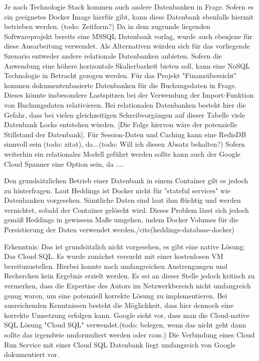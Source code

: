 \documentclass[pdftex,a4paper,abstracton,11pt,parskip=half,bibtotocnumbered]{scrartcl}
\begin{document}
		
		Je nach Technologie Stack kommen auch andere Datenbanken in Frage. Sofern es ein geeignetes Docker Image hierfür gibt, kann diese Datenbank ebenfalls hiermit betrieben werden. (todo: Zeitform?) Da in dem zugrunde liegenden Softwareprojekt bereits eine MSSQL Datenbank vorlag, wurde auch ebenjene für diese Ausarbeitung verwendet. Als Alternativen würden sich für das vorliegende Szenario entweder andere relationale Datenbanken anbieten. Sofern die Anwendung eine höhere horizontale Skalierbarkeit bieten soll, kann eine NoSQL Technologie in Betracht gezogen werden. Für das Projekt "Finanzübersicht" kommen dokumentenbasierte Datenbanken für die Buchungsdaten in Frage. Dieses könnte insbesondere Lastspitzen bei der Verwendung der Import-Funktion von Buchungsdaten relativieren. Bei relationalen Datenbanken besteht hier die Gefahr, dass bei vielen gleichzeitigen Schreibvorgängen auf dieser Tabelle viele Datenbank Locks entstehen würden. [Die Folge hiervon wäre der potenzielle Stillstand der Datenbank]. Für Session-Daten und Caching kann eine RedisDB sinnvoll sein (todo: zitat), da...(todo: Will ich diesen Absatz behalten?) Sofern weiterhin ein relationales Modell geführt werden sollte kann auch der Google Cloud Spanner eine Option sein, da .... 
		
		Den grundsätzlichen Betrieb einer Datenbank in einem Container gilt es jedoch zu hinterfragen. Laut Heddings ist Docker nicht für "stateful services" wie Datenbanken vorgesehen. Sämtliche Daten sind laut ihm flüchtig und werden vernichtet, sobald der Container gelöscht wird. Dieses Problem lässt sich jedoch gemäß Heddings in gewissem Maße umgehen, indem Docker Volumes für die Persistierung der Daten verwendet werden./cite(heddings-database-docker) 
		
		
	
		Erkenntnis: Das ist grundsätzlich nicht vorgesehen, es gibt eine native Lösung: Das Cloud SQL. Es wurde zunächst versucht mit einer kostenlosen
		VM bereituzustellen. Hierbei konnte nach umfangreichen Anstrengungen und Recherchen kein Ergebnis erzielt werden. Es sei an dieser Stelle jedoch
		kritisch zu vermerken, dass die Expertise des Autors im Netzwerkbereich nicht umfangreich genug waren, um eine potenziell korrekte Lösung zu implementieren.
		Bei ausreichenden Kenntnissen besteht die Möglichkeit, dass hier dennoch eine korrekte Umsetzung erfolgen kann. Google sieht vor, dass man die
		Cloud-native SQL Lösung "Cloud SQL" verwendet.(todo: belegen, wenn das nicht geht dann sollte das irgendwie umformuliert werden oder raus.)
		Die Verbindung eines Cloud Run Service mit einer Cloud SQL Datenbank liegt umfangreich von Google dokumentiert vor. 
\end{document}
